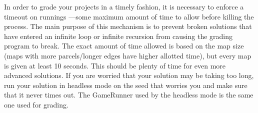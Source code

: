 \documentclass[11pt]{article}
\begin{document}
In order to grade your projects in a timely fashion, it is necessary to enforce a timeout on runnings ---some maximum amount of time to allow before killing the process. The main purpose of this mechanism is to prevent broken solutions that have entered an infinite loop or infinite recursion from causing the grading program to break. The exact amount of time allowed is based on the map size (maps with more parcels/longer edges have higher allotted time), but every map is given at least 10 seconds. This should be plenty of time for even more advanced solutions. If you are worried that your solution may be taking too long, run your solution in headless mode on the seed that worries you and make sure that it never times out. The GameRunner used by the headless mode is the same one used for grading.
\end{document}
